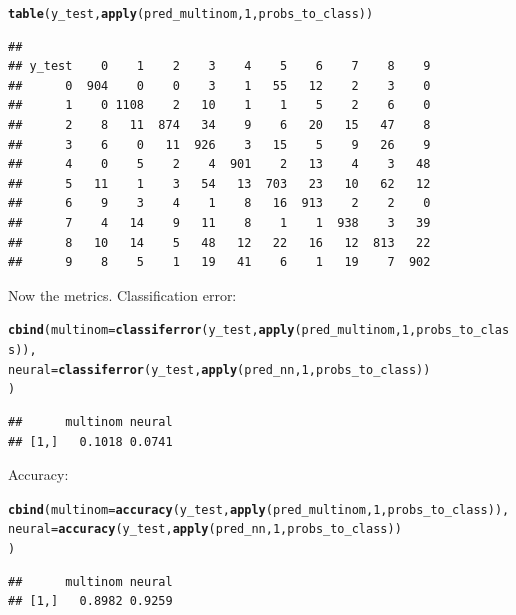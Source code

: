 \documentclass[a4paper]{article}
\makeatletter
\newcommand{\hlnum}[1]{\textcolor[rgb]{0.686,0.059,0.569}{#1}}%
\newcommand{\hlstd}[1]{\textcolor[rgb]{0.345,0.345,0.345}{#1}}%
\newcommand{\hlkwc}[1]{\textcolor[rgb]{0.333,0.667,0.333}{#1}}%
\newcommand{\hlkwd}[1]{\textcolor[rgb]{0.737,0.353,0.396}{\textbf{#1}}}%
\newenvironment{kframe}{%
 \def\at@end@of@kframe{}%
 \ifinner\ifhmode%
  \def\at@end@of@kframe{\end{minipage}}%
  \begin{minipage}{\columnwidth}%
 \fi\fi%
 \def\FrameCommand##1{\hskip\@totalleftmargin \hskip-\fboxsep
 \colorbox{shadecolor}{##1}\hskip-\fboxsep
     \hskip-\linewidth \hskip-\@totalleftmargin \hskip\columnwidth}%
 \MakeFramed {\advance\hsize-\width
   \@totalleftmargin\z@ \linewidth\hsize
   \@setminipage}}%
 {\par\unskip\endMakeFramed%
 \at@end@of@kframe}
\newenvironment{knitrout}{}{} %
\makeatother
\begin{document}
{\begin{enumerate}
\begin{knitrout}
\color{fgcolor}\begin{kframe}
\begin{alltt}
\hlkwd{table}\hlstd{(y_test,} \hlkwd{apply}\hlstd{(pred_multinom,}\hlnum{1}\hlstd{,probs_to_class))}
\end{alltt}
\begin{verbatim}
##       
## y_test    0    1    2    3    4    5    6    7    8    9
##      0  904    0    0    3    1   55   12    2    3    0
##      1    0 1108    2   10    1    1    5    2    6    0
##      2    8   11  874   34    9    6   20   15   47    8
##      3    6    0   11  926    3   15    5    9   26    9
##      4    0    5    2    4  901    2   13    4    3   48
##      5   11    1    3   54   13  703   23   10   62   12
##      6    9    3    4    1    8   16  913    2    2    0
##      7    4   14    9   11    8    1    1  938    3   39
##      8   10   14    5   48   12   22   16   12  813   22
##      9    8    5    1   19   41    6    1   19    7  902
\end{verbatim}
\end{kframe}
\end{knitrout}

Now the metrics. Classification error:

\begin{knitrout}
\color{fgcolor}\begin{kframe}
\begin{alltt}
\hlkwd{cbind}\hlstd{(}\hlkwc{multinom} \hlstd{=} \hlkwd{classiferror}\hlstd{(y_test,} \hlkwd{apply}\hlstd{(pred_multinom,}\hlnum{1}\hlstd{,probs_to_class)),}
      \hlkwc{neural} \hlstd{=} \hlkwd{classiferror}\hlstd{(y_test,} \hlkwd{apply}\hlstd{(pred_nn,}\hlnum{1}\hlstd{,probs_to_class))}
\hlstd{)}
\end{alltt}
\begin{verbatim}
##      multinom neural
## [1,]   0.1018 0.0741
\end{verbatim}
\end{kframe}
\end{knitrout}

Accuracy:

\begin{knitrout}
\color{fgcolor}\begin{kframe}
\begin{alltt}
\hlkwd{cbind}\hlstd{(}\hlkwc{multinom} \hlstd{=} \hlkwd{accuracy}\hlstd{(y_test,} \hlkwd{apply}\hlstd{(pred_multinom,}\hlnum{1}\hlstd{,probs_to_class)),}
      \hlkwc{neural} \hlstd{=} \hlkwd{accuracy}\hlstd{(y_test,} \hlkwd{apply}\hlstd{(pred_nn,}\hlnum{1}\hlstd{,probs_to_class))}
\hlstd{)}
\end{alltt}
\begin{verbatim}
##      multinom neural
## [1,]   0.8982 0.9259
\end{verbatim}
\end{kframe}
\end{knitrout}


\end{enumerate}}
\end{document}
